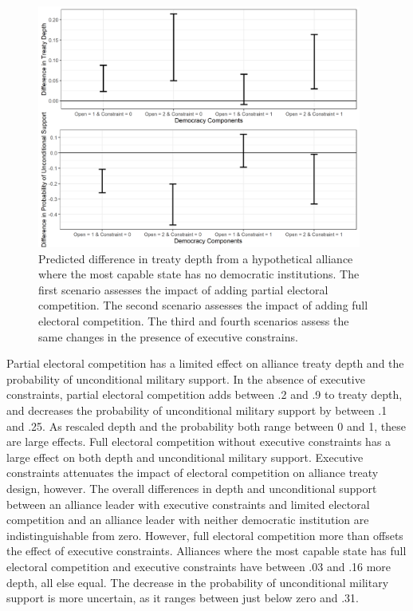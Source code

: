 \documentclass[12pt]{article}
\begin{document}
\begin{figure}[hbtp]
\centering
\includegraphics[width=0.95\textwidth]{../figures/results-diff.png}
\caption{Predicted difference in treaty depth from a hypothetical alliance where the most capable state has no democratic institutions. The first scenario assesses the impact of adding partial electoral competition. The second scenario assesses the impact of adding full electoral competition. The third and fourth scenarios assess the same changes in the presence of executive constrains.}
\label{fig:results-diff}
\end{figure}


Partial electoral competition has a limited effect on alliance treaty depth and the probability of unconditional military support. 
In the absence of executive constraints, partial electoral competition adds between .2 and .9 to treaty depth, and decreases the probability of unconditional military support by between .1 and .25.
As rescaled depth and the probability both range between 0 and 1, these are large effects. 
Full electoral competition without executive constraints has a large effect on both depth and unconditional military support. 
Executive constraints attenuates the impact of electoral competition on alliance treaty design, however. 
The overall differences in depth and unconditional support between an alliance leader with executive constraints and limited electoral competition and an alliance leader with neither democratic institution are indistinguishable from zero. 
However, full electoral competition more than offsets the effect of executive constraints.
Alliances where the most capable state has full electoral competition and executive constraints have between .03 and .16 more depth, all else equal. 
The decrease in the probability of unconditional military support is more uncertain, as it ranges between just below zero and .31. 
\end{document}
